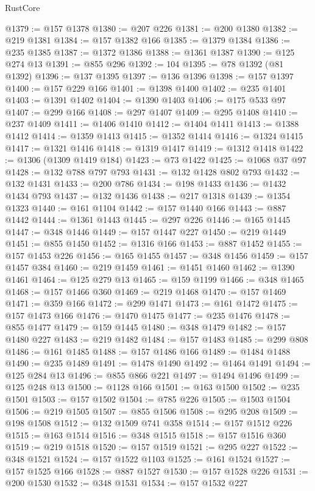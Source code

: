 \begin{lexlean}{RustCore}
\begin{coremodule}
@1379 := @157 @1378
@1380 := @207 @226
@1381 := @200 @1380
@1382 := @219 @1381
@1384 := @157 @1382 @166
@1385 := @1379 @1384
@1386 := @235 @1385
@1387 := @1372 @1386
@1388 := @1361 @1387
@1390 := @125 @274 @13
@1391 := @855 @296
@1392 := 104
@1395 := @78 @1392 (@81 @1392)
@1396 := @137 @1395
@1397 := @136 @1396
@1398 := @157 @1397
@1400 := @157 @229 @166
@1401 := @1398 @1400
@1402 := @235 @1401
@1403 := @1391 @1402
@1404 := @1390 @1403
@1406 := @175 @533 @97
@1407 := @299 @166
@1408 := @297 @1407
@1409 := @295 @1408
@1410 := @237 @1409
@1411 := @1406 @1410
@1412 := @1404 @1411
@1413 := @1388 @1412
@1414 := @1359 @1413
@1415 := @1352 @1414
@1416 := @1324 @1415
@1417 := @1321 @1416
@1418 := @1319 @1417
@1419 := @1312 @1418
@1422 := @1306 (@1309 @1419 @184)
@1423 := @73 @1422
@1425 := @1068 @37 @97
@1428 := @132 @788 @797 @793
@1431 := @132 @1428 @802 @793
@1432 := @132 @1431
@1433 := @200 @786
@1434 := @198 @1433
@1436 := @1432 @1434 @793
@1437 := @132 @1436
@1438 := @217 @1318
@1439 := @1354 @1323
@1440 := @161 @1104
@1442 := @157 @1440 @166
@1443 := @887 @1442
@1444 := @1361 @1443
@1445 := @297 @226
@1446 := @165 @1445
@1447 := @348 @1446
@1449 := @157 @1447 @227
@1450 := @219 @1449
@1451 := @855 @1450
@1452 := @1316 @166
@1453 := @887 @1452
@1455 := @157 @1453 @226
@1456 := @165 @1455
@1457 := @348 @1456
@1459 := @157 @1457 @384
@1460 := @219 @1459
@1461 := @1451 @1460
@1462 := @1390 @1461
@1464 := @125 @279 @13
@1465 := @159 @1199
@1466 := @348 @1465
@1468 := @157 @1466 @360
@1469 := @219 @1468
@1470 := @157 @1469
@1471 := @359 @166
@1472 := @299 @1471
@1473 := @161 @1472
@1475 := @157 @1473 @166
@1476 := @1470 @1475
@1477 := @235 @1476
@1478 := @855 @1477
@1479 := @159 @1445
@1480 := @348 @1479
@1482 := @157 @1480 @227
@1483 := @219 @1482
@1484 := @157 @1483
@1485 := @299 @808
@1486 := @161 @1485
@1488 := @157 @1486 @166
@1489 := @1484 @1488
@1490 := @235 @1489
@1491 := @1478 @1490
@1492 := @1464 @1491
@1494 := @125 @284 @13
@1496 := @855 @866 @221
@1497 := @1494 @1496
@1499 := @125 @248 @13
@1500 := @1128 @166
@1501 := @163 @1500
@1502 := @235 @1501
@1503 := @157 @1502
@1504 := @785 @226
@1505 := @1503 @1504
@1506 := @219 @1505
@1507 := @855 @1506
@1508 := @295 @208
@1509 := @198 @1508
@1512 := @132 @1509 @741 @358
@1514 := @157 @1512 @226
@1515 := @163 @1514
@1516 := @348 @1515
@1518 := @157 @1516 @360
@1519 := @219 @1518
@1520 := @157 @1519
@1521 := @295 @227
@1522 := @348 @1521
@1524 := @157 @1522 @1103
@1525 := @161 @1524
@1527 := @157 @1525 @166
@1528 := @887 @1527
@1530 := @157 @1528 @226
@1531 := @200 @1530
@1532 := @348 @1531
@1534 := @157 @1532 @227

\end{coremodule}
\end{lexlean}
